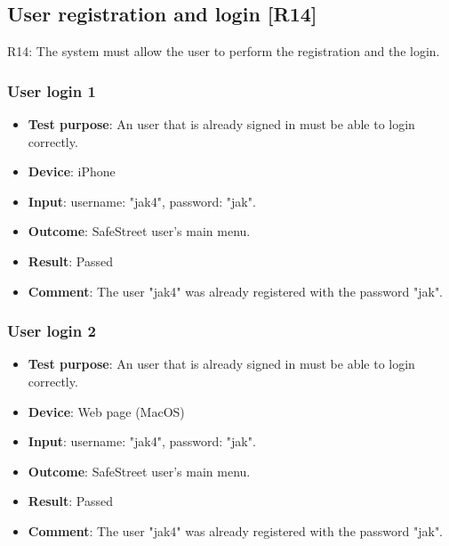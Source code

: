 \documentclass[../ATD.tex]{subfiles}
\begin{document}
    \subsection{User registration and login [R14]}\label{subsec:user-registration-and-login}
    R14: The system must allow the user to perform the registration and the login.

    \subsubsection{User login 1}\label{subsubsec:user-login-1}
    \begin{itemize}
        \item \textbf{Test purpose}: An user that is already signed in must be able to login correctly.
        \item \textbf{Device}: iPhone
        \item \textbf{Input}: username: "jak4", password: "jak".
        \item \textbf{Outcome}: SafeStreet user's main menu.
        \item \textbf{Result}: Passed
        \item \textbf{Comment}: The user "jak4" was already registered with the password "jak".
    \end{itemize}

    \subsubsection{User login 2}\label{subsubsec:user-login-2}
    \begin{itemize}
        \item \textbf{Test purpose}: An user that is already signed in must be able to login correctly.
        \item \textbf{Device}: Web page (MacOS)
        \item \textbf{Input}: username: "jak4", password: "jak".
        \item \textbf{Outcome}: SafeStreet user's main menu.
        \item \textbf{Result}: Passed
        \item \textbf{Comment}: The user "jak4" was already registered with the password "jak".
    \end{itemize}
\end{document}
